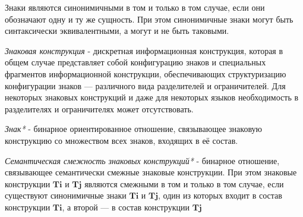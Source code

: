\begin{SCn}


\end{SCn}

Знаки являются синонимичными в том и только в том случае, если они обозначают одну и ту же сущность.
При этом синонимичные знаки могут быть синтаксически эквивалентными, а могут и не быть таковыми.

\begin{SCn}


\end{SCn}

\textit{Знаковая конструкция} - дискретная информационная конструкция, которая в общем случае представляет собой конфигурацию знаков и специальных фрагментов информационной конструкции, обеспечивающих структуризацию конфигурации знаков — различного вида разделителей и ограничителей.
Для некоторых знаковых конструкций и даже для некоторых языков необходимость в разделителях и ограничителях может отсутствовать.

\begin{SCn}

        \begin{scnindent}
        \end{scnindent}

\end{SCn}

\textit{Знак*} - бинарное ориентированное отношение, связывающее знаковую конструкцию со множеством всех знаков, входящих в её состав.

\textit{Семантическая смежность знаковых конструкций*} - бинарное отношение, связывающее семантически смежные знаковые конструкции.
При этом знаковые конструкции $\bm{Ti}$ и $\bm{Tj}$ являются смежными в том и только в том случае, если существуют синонимичные знаки $\bm{Ti}$ и $\bm{Tj}$, один из которых входит в состав конструкции $\bm{Ti}$, а второй — в состав конструкции $\bm{Tj}$

